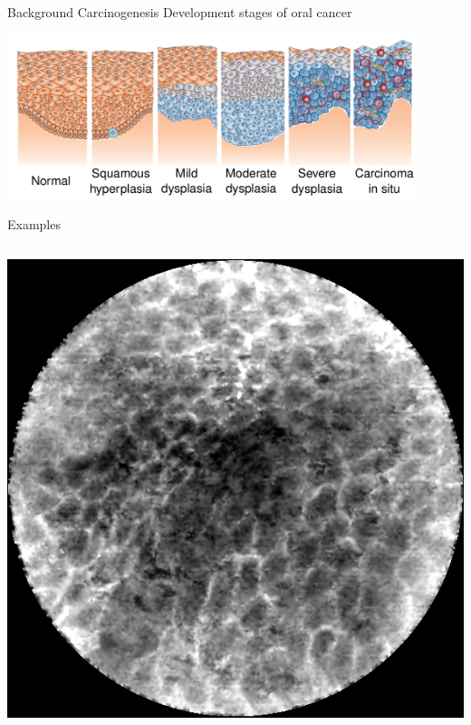 \begin{frame}{Background Carcinogenesis}
	Development stages of oral cancer

	\includegraphics[width=0.9\textwidth]{img2/cancer_states.png}
\end{frame}

\begin{frame}{Examples}
	\begin{columns}[T]
		\begin{column}{0.45\textwidth}
			\centering
			\includegraphics[height=0.75\textheight]{img2/healthy.png}


\end{column}
\end{columns}
\end{frame}
